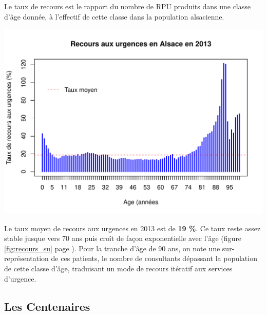 \documentclass[12pt,english,french,twoside]{book}\usepackage[]{graphicx}\usepackage[]{color}
\makeatletter
\def\maxwidth{ %
  \ifdim\Gin@nat@width>\linewidth
    \linewidth
  \else
    \Gin@nat@width
  \fi
}
\newenvironment{knitrout}{}{} %
\makeatother
\begin{document}
Le taux de recours est le rapport du nombre de RPU produits dans une classe d'âge donnée, à l'effectif de cette classe dans la population alsacienne. 

\begin{center}
\begin{knitrout}
\color{fgcolor}
\includegraphics[width=\maxwidth]{figure/alsace_recours-1} 

\end{knitrout}
\label{fig:recours_su}
\end{center}


Le taux moyen de recours aux urgences en 2013 est de \textbf{19 \%}. Ce taux reste assez stable jusque vers 70 ans puis croît de façon exponentielle avec l'âge (figure \ref{fig:recours_su} page \pageref{fig:recours_su}). Pour la tranche d'âge de 90 ans, on note une sur-représentation de ces patients, le nombre de consultants dépassant la population de cette classe d'âge, traduisant un mode de recours itératif aux services d'urgence.

\subsection*{Les Centenaires}
\label{centenaires}
\end{document}
